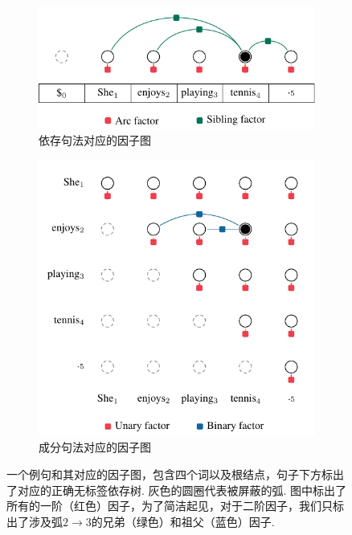 \begin{figure}[tb]
    \centering
    \begin{subfigure}[b]{0.8\textwidth}
        \centering
        \includegraphics[scale=1]{figures/dep-factors.pdf}
        \caption{依存句法对应的因子图}
        \label{fig:con-factors}
    \end{subfigure}
    \begin{subfigure}[b]{0.8\textwidth}
        \centering
        \includegraphics[scale=1]{figures/con-factors.pdf}
        \caption{成分句法对应的因子图}
        \label{fig:dep-factors}
    \end{subfigure}
    \caption{一个例句和其对应的因子图，包含四个词以及根结点，句子下方标出了对应的正确无标签依存树. 灰色的圆圈代表被屏蔽的弧.
        图中标出了所有的一阶（红色）因子，为了简洁起见，对于二阶因子，我们只标出了涉及弧$2\rightarrow 3$的兄弟（绿色）和祖父（蓝色）因子.}
    \label{fig:dep-vi-factors}
\end{figure}

